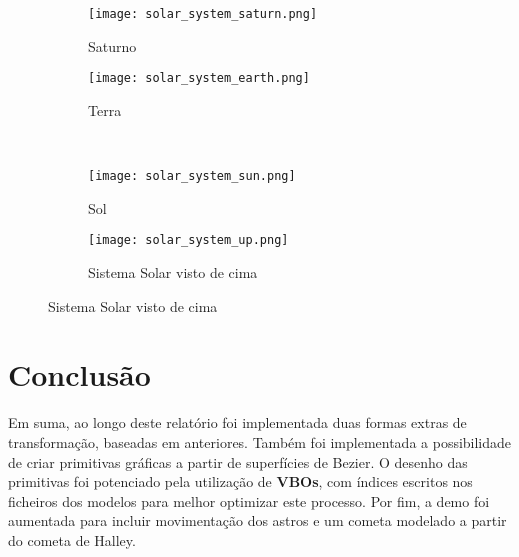 \documentclass[14pt, a4 paper]{report}
\begin{document}
\begin{figure}[t]
    \centering
    \begin{subfigure}{.5\textwidth}
    \centering
    \texttt{[image: solar\_system\_saturn.png]}
    \caption{Saturno}
    \label{fig:sub5}
    \end{subfigure}%
    \begin{subfigure}{.5\textwidth}
    \centering
    \texttt{[image: solar\_system\_earth.png]}
    \caption{Terra}
    \label{fig:sub6}
    \end{subfigure}%
    \\
    \begin{subfigure}{.5\textwidth}
    \centering
    \texttt{[image: solar\_system\_sun.png]}
    \caption{Sol}
    \label{fig:sub5}
    \end{subfigure}%
    \begin{subfigure}{.5\textwidth}
    \centering
    \texttt{[image: solar\_system\_up.png]}
    \caption{Sistema Solar visto de cima}
    \label{fig:sub6}
    \end{subfigure}%
    \label{fig:2}
\end{figure}

\chapter{Conclusão} \label{chap:conclusion}

Em suma, ao longo deste relatório foi implementada duas formas extras de transformação, baseadas em anteriores. Também foi implementada a possibilidade de criar primitivas gráficas a partir de superfícies de Bezier. O desenho das primitivas foi potenciado pela utilização de \textbf{VBOs}, com índices escritos nos ficheiros dos modelos para melhor optimizar este processo. Por fim, a demo foi aumentada para incluir movimentação dos astros e um cometa modelado a partir do cometa de Halley.
\end{document}
